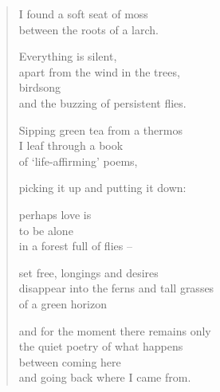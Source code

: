 

\begin{verse}
I found a soft seat of moss\\
between the roots of a larch.

Everything is silent,\\
apart from the wind in the trees,\\
birdsong\\
and the buzzing of persistent flies.

Sipping green tea from a thermos\\
I leaf through a book\\
of `life-affirming' poems,

picking it up and putting it down:

perhaps love is\\
to be alone\\
in a forest full of flies --

set free, longings and desires\\
disappear into the ferns and tall grasses\\
of a green horizon

and for the moment there remains only\\
the quiet poetry of what happens\\
between coming here\\
and going back where I came from.
\end{verse}

